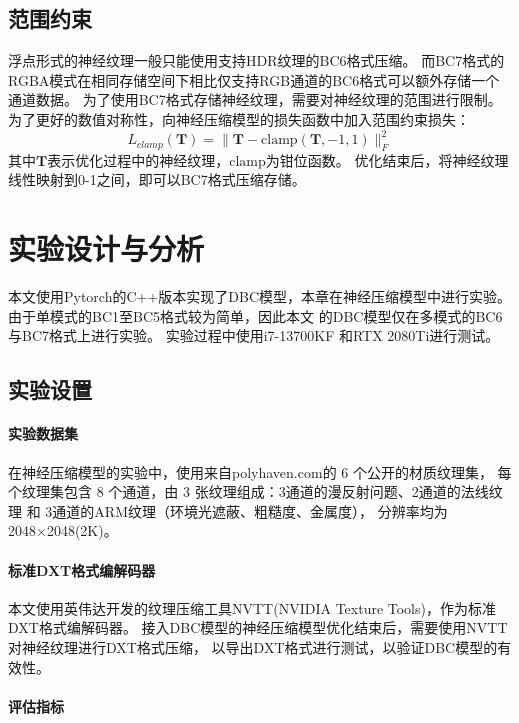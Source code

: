\subsection{范围约束}
\label{范围约束}

浮点形式的神经纹理一般只能使用支持HDR纹理的BC6格式压缩。
而BC7格式的RGBA模式在相同存储空间下相比仅支持RGB通道的BC6格式可以额外存储一个通道数据。
为了使用BC7格式存储神经纹理，需要对神经纹理的范围进行限制。
为了更好的数值对称性，向神经压缩模型的损失函数中加入范围约束损失：
\begin{equation}
L_{clamp}(\mathbf{T})=\|\mathbf{T}-\text{clamp}(\mathbf{T},-1,1)\|_F^2
\end{equation}
其中$\mathbf{T}$表示优化过程中的神经纹理，$\text{clamp}$为钳位函数。
优化结束后，将神经纹理线性映射到0-1之间，即可以BC7格式压缩存储。


\section{实验设计与分析}

本文使用Pytorch的C++版本实现了DBC模型，本章在神经压缩模型中进行实验。
由于单模式的BC1至BC5格式较为简单，因此本文
的DBC模型仅在多模式的BC6与BC7格式上进行实验。
实验过程中使用i7-13700KF
和RTX 2080Ti进行测试。

\subsection{实验设置}

\paragraph{实验数据集}

在神经压缩模型的实验中，使用来自polyhaven.com\cite{PolyHaven}的 6 个公开的材质纹理集，
每个纹理集包含 8 个通道，由 3 张纹理组成：3通道的漫反射问题、2通道的法线纹理 和 3通道的ARM纹理（环境光遮蔽、粗糙度、金属度），
分辨率均为2048×2048(2K)。

\paragraph{标准DXT格式编解码器}

本文使用英伟达开发的纹理压缩工具NVTT(NVIDIA Texture Tools)，作为标准DXT格式编解码器。
接入DBC模型的神经压缩模型优化结束后，需要使用NVTT对神经纹理进行DXT格式压缩，
以导出DXT格式进行测试，以验证DBC模型的有效性。

\paragraph{评估指标}

